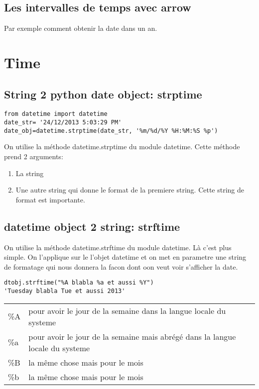 \documentclass[12pt,a4paper]{article}
\begin{document}
\subsection{Les intervalles de temps avec arrow}
\label{sec:inter}

Par exemple comment obtenir la date dans un an.

\section{Time}
\label{sec:time}

\subsection{String 2 python date object: strptime}
\label{sec:string2datetime}

\begin{verbatim}
from datetime import datetime
date_str= '24/12/2013 5:03:29 PM'
date_obj=datetime.strptime(date_str, '%m/%d/%Y %H:%M:%S %p')
\end{verbatim}

On utilise la méthode datetime.strptime du module datetime. Cette méthode prend 2 arguments:
\begin{enumerate}
\item La string
\item Une autre string qui donne le format de la premiere string. Cette string de format est importante.
\end{enumerate}


\subsection{datetime object 2 string: strftime}
\label{sec:datetime2str}

On utilise la méthode datetime.strftime du module datetime. Là c'est plus simple. On l'applique sur le l'objet datetime et on met en parametre une string de formatage qui nous donnera la facon dont oon veut voir s'afficher la date.  
\begin{verbatim}
dtobj.strftime("%A blabla %a et aussi %Y")
'Tuesday blabla Tue et aussi 2013'
\end{verbatim}

\begin{tabular}[l]{lll}
\%A&pour avoir le jour de la semaine dans la langue locale du systeme&\\
\%a&pour avoir le jour de la semaine mais abrégé dans la langue locale du systeme &\\ 
\%B&la même chose mais pour le mois&\\
\%b&la même chose mais pour le mois&\\
\end{tabular}
\end{document}
